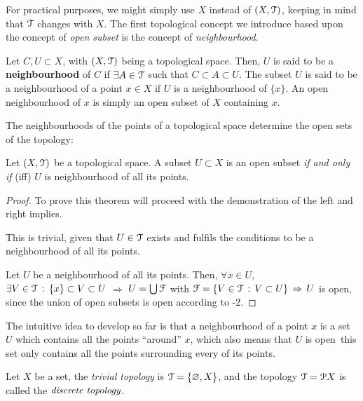 For practical purposes, we might simply use $X$ instead of $(X, \EuScript{T})$, keeping in mind
that $\EuScript{T}$ changes with $X$.
The first topological concept we introduce based upon the concept of \emph{open subset} is
the concept of \emph{neighbourhood}.

\begin{definition}
	\label{def:neighbourhood}
	Let $C, U\subset X$, with $(X, \EuScript{T})$ being a topological space. Then, $U$ is said to
	be a \textbf{neighbourhood} of $C$ if $\exists A\in\EuScript{T}$ such that $C\subset A \subset U$.
	The subset $U$ is said to be a neighbourhood of a point $x\in X$ if $U$ is a
	neighbourhood of $\{x\}$.
	An open neighbourhood of $x$ is simply an open subset of $X$ containing $x$.
\end{definition}

The neighbourhoods of the points of a topological space determine the open sets of the topology:

\begin{theorem}
	Let $(X, \EuScript{T})$ be a topological space. A subset $U\subset X$ is an open subset
	\emph{if and only if} (iff) $U$ is neighbourhood of all its points.
\end{theorem}

\begin{proof} To prove this theorem will proceed with the demonstration of the left and
right implies.

\noindent{$\boxed{\Rightarrow}$} This is trivial, given that $U\in\EuScript{T}$ exists and
fulfils the conditions to be a neighbourhood of all its points.

\noindent{$\boxed{\Leftarrow}$} Let $U$ be a neighbourhood of all its points.
Then, $\forall x\in U$, $\exists V\in \EuScript{T}\,:\,\{x\}\subset V\subset U$ $\Rightarrow$
$U = \bigcup\EuScript{F}$ with $\EuScript{F}=\{V\in\EuScript{T}\,:\,V\subset U\}\,\Rightarrow\,U$ is open, since the union
of open subsets is open according to -2.
\end{proof}

The intuitive idea to develop so far is that a neighbourhood of a point $x$ is a set
$U$ which contains all the points ``around'' $x$, which also means that $U$ is open
\iff\,this set only contains all the points surrounding every of its points.

\begin{example}
	Let $X$ be a set, the \emph{trivial topology} is $\EuScript{T}=\{\varnothing, X\}$, and the
	topology $\EuScript{T}=\EuScript{P} X$ is called the $\emph{discrete topology}$.
\end{example}

